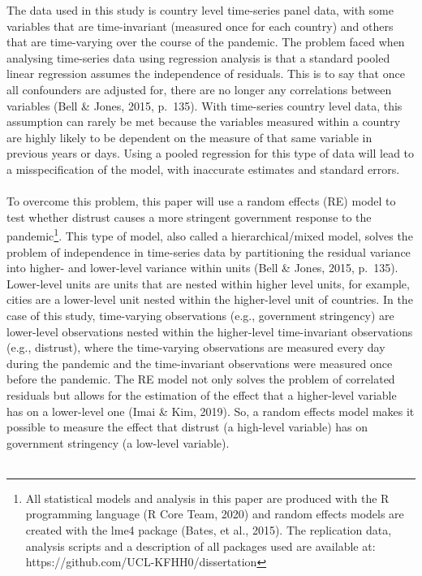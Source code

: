 \documentclass[
  12pt,
]{article}
\begin{document}
The data used in this study is country level time-series panel data, with some variables that are time-invariant (measured once for each country) and others that are time-varying over the course of the pandemic. The problem faced when analysing time-series data using regression analysis is that a standard pooled linear regression assumes the independence of residuals. This is to say that once all confounders are adjusted for, there are no longer any correlations between variables (Bell \& Jones, 2015, p.~135). With time-series country level data, this assumption can rarely be met because the variables measured within a country are highly likely to be dependent on the measure of that same variable in previous years or days. Using a pooled regression for this type of data will lead to a misspecification of the model, with inaccurate estimates and standard errors.\\
~\\
To overcome this problem, this paper will use a random effects (RE) model to test whether distrust causes a more stringent government response to the pandemic\footnote{All statistical models and analysis in this paper are produced with the R programming language (R Core Team, 2020) and random effects models are created with the lme4 package (Bates, et al., 2015). The replication data, analysis scripts and a description of all packages used are available at: https://github.com/UCL-KFHH0/dissertation}. This type of model, also called a hierarchical/mixed model, solves the problem of independence in time-series data by partitioning the residual variance into higher- and lower-level variance within units (Bell \& Jones, 2015, p.~135). Lower-level units are units that are nested within higher level units, for example, cities are a lower-level unit nested within the higher-level unit of countries. In the case of this study, time-varying observations (e.g., government stringency) are lower-level observations nested within the higher-level time-invariant observations (e.g., distrust), where the time-varying observations are measured every day during the pandemic and the time-invariant observations were measured once before the pandemic. The RE model not only solves the problem of correlated residuals but allows for the estimation of the effect that a higher-level variable has on a lower-level one (Imai \& Kim, 2019). So, a random effects model makes it possible to measure the effect that distrust (a high-level variable) has on government stringency (a low-level variable).\\
~\\
\end{document}
